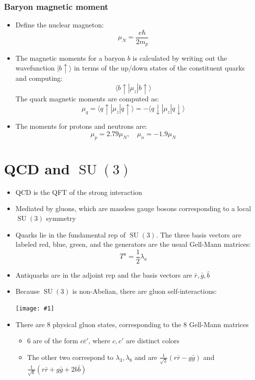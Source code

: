 \documentclass[11pt]{article}
\newcommand{\cbar}{\bar{c}}
\newcommand{\ra}{\rangle}
\newcommand{\la}{\langle}
\DeclareMathOperator{\SU}{SU}
\newcommand{\embedimgw}[2]{\begin{center}\texttt{[image: \#1]}\end{center}}
\begin{document}
\subsubsection{Baryon magnetic moment}
\begin{itemize}
  \item Define the nuclear magneton:
  \begin{equation}
    \mu_N = \frac{e\hbar}{2m_p}
  \end{equation}
  \item The magnetic moments for a baryon $b$ is calculated by writing out the wavefunction $|b\uparrow\ra$ in terms of the up/down states of the constituent quarks and computing:
  \begin{equation}
    \la b\uparrow | \mu_z | b\uparrow\ra
  \end{equation}
  The quark magnetic moments are computed as:
  \begin{equation}
    \mu_q = \la q\uparrow | \mu_z | q\uparrow\ra = - \la q\downarrow | \mu_z | q\downarrow\ra
  \end{equation}
  \item The moments for protons and neutrons are:
  \begin{equation}
    \mu_p = 2.79\mu_N,\quad \mu_n = -1.9\mu_N
  \end{equation}
\end{itemize}

\section{QCD and $\SU(3)$}
\begin{itemize}
  \item QCD is the QFT of the strong interaction
    \item Mediated by gluons, which are massless gauge bosons corresponding to a local $\SU(3)$ symmetry
    \item Quarks lie in the fundamental rep of $\SU(3)$. The three basis vectors are labeled red, blue, green, and the generators are the usual Gell-Mann matrices:
    \begin{equation}
      T^a = \frac{1}{2}\lambda_a
    \end{equation}
    \item Antiquarks are in the adjoint rep and the basis vectors are $\bar r,\bar g, \bar b$
    \item Because $\SU(3)$ is non-Abelian, there are gluon self-interactions:
    \embedimgw{figs/qcdvertices.png}{.6}
    \item There are 8 physical gluon states, corresponding to the 8 Gell-Mann matrices
    \begin{itemize}
      \item 6 are of the form $c\cbar'$, where $c,c'$ are distinct colors
      \item The other two correspond to $\lambda_3,\lambda_8$ and are $\frac{1}{\sqrt2}(r\bar r-g\bar g)$ and $\frac{1}{\sqrt6}(r\bar r + g\bar g + 2b\bar b)$
    \end{itemize}
\end{itemize}
\end{document}
